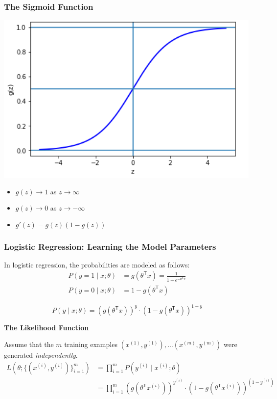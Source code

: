 \documentclass[xcolor=table]{beamer}
\newcommand{\trans}[1]{\ensuremath{#1}^{\scriptscriptstyle{\textsf{T}}}}
\begin{document}
\begin{frame}[t]
\frametitle{The Sigmoid Function}
\begin{center}
	\includegraphics[scale=0.3]{sigmoid_function.png}
\end{center}

\begin{itemize}
	\item $g(z) \to 1$ as $z \to \infty$
	\item $g(z) \to 0$ as $z \to -\infty$
	\item $g'(z) = g(z) (1 - g(z))$
\end{itemize}
\end{frame}

\begin{frame}[t]
\frametitle{Logistic Regression: Learning the Model Parameters}
In logistic regression, the probabilities are modeled as follows:
\begin{equation*}
\begin{split}
P(y = 1 \mid x; \theta) & = g(\trans{\theta} x) = \frac{1}{1 + e^{- \trans{\theta} x}} \\
P(y = 0 \mid x; \theta) & = 1 - g(\trans{\theta} x) 
\end{split}
\end{equation*}

\pause

\[
	P(y \mid x; \theta) = \left( g(\trans{\theta} x) \right)^{y} \cdot 
		\left ( 1 - g(\trans{\theta} x) \right )^{1 - y}
\]

\pause

\textbf{The Likelihood Function} 

Assume that the $m$ training examples $(x^{(1)}, y^{(1)}), \ldots (x^{(m)}, y^{(m)})$ were generated \emph{independently}. 
\begin{equation*}
\begin{split}
		L(\theta; \{(x^{(i)}, y^{(i)})\}_{i = 1}^{m}) & = 
				\prod_{i = 1}^{m} P(y^{(i)} \mid x^{(i)}; \theta) \\
				& = \prod_{i = 1}^{m} \left( g(\trans{\theta} x^{(i)}) \right)^{y^{(i)}} \cdot 
						\left ( 1 - g(\trans{\theta} x^{(i)}) \right )^{(1 - y^{(i)})} \\
\end{split}
\end{equation*}
\end{frame}
\end{document}

